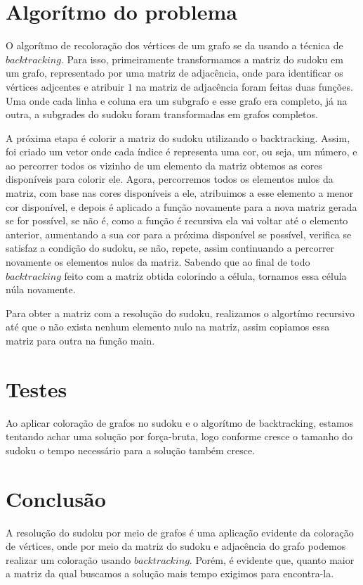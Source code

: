 \documentclass[12pt,a4paper]{article}
\begin{document}
	\section{Algorítmo do problema}
	O algorítmo de recoloração dos vértices de um grafo se da usando a técnica de $backtracking$. Para isso, primeiramente transformamos a matriz do sudoku em um grafo, representado por uma matriz de adjacência, onde para identificar os vértices adjcentes e atribuir $1$ na matriz de adjacência foram feitas duas funções. Uma onde cada linha e coluna era um subgrafo e esse grafo era completo, já na outra, a subgrades do sudoku foram transformadas em grafos completos.
	
	A próxima etapa é colorir a matriz do sudoku utilizando o backtracking. Assim, 
	foi criado um vetor onde cada índice é representa uma cor, ou seja, um número, e ao percorrer todos os vizinho de um elemento da matriz obtemos as cores disponíveis para colorir ele. Agora, percorremos todos os elementos nulos da matriz, com base nas cores disponíveis a ele, atribuimos a esse elemento a menor cor disponível, e depois é aplicado a função novamente para a nova matriz gerada se for possível, se não é, como a função é recursiva ela vai voltar até o elemento anterior, aumentando a sua cor para a próxima disponível se possível, verifica se satisfaz a condição do sudoku, se não, repete, assim continuando a percorrer novamente os elementos nulos da matriz. Sabendo que ao final de todo $backtracking$ feito com a matriz obtida colorindo a célula, tornamos essa célula núla novamente.
	
	Para obter a matriz com a resolução do sudoku, realizamos o algortímo recursivo até que o não exista nenhum elemento nulo na matriz, assim copiamos essa matriz para outra na função main. 
	
	\section{Testes}
	
	Ao aplicar coloração de grafos no sudoku e o algorítmo de backtracking, estamos tentando achar uma solução por força-bruta, logo conforme cresce o tamanho do sudoku o tempo necessário para a solução também cresce.
	\pagebreak

	\section{Conclusão}
	A resolução do sudoku por meio de grafos é uma aplicação evidente da coloração de vértices, onde por meio da matriz do sudoku e adjacência do grafo podemos realizar um coloração usando $backtracking$. Porém, é evidente que, quanto maior a matriz da qual buscamos a solução mais tempo exigimos para encontra-la.
	\pagebreak
	
	\printbibliography
	
\end{document}
